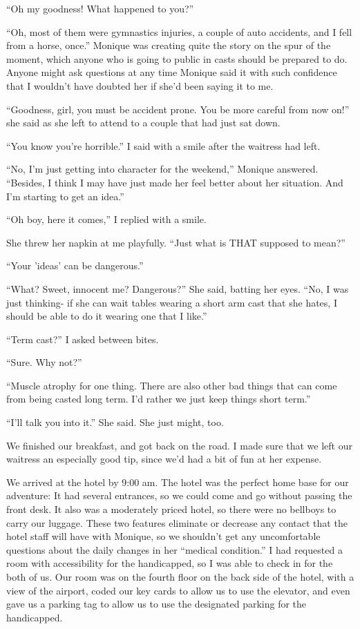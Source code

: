``Oh my goodness! What happened to you?''

``Oh, most of them were gymnastics injuries, a couple of auto accidents, and I fell from a
horse, once.'' Monique was creating quite the story on the spur of the moment, which anyone who
is going to public in casts should be prepared to do. Anyone might ask questions at any time
Monique said it with such confidence that I wouldn't have doubted her if she'd been saying it to
me.

``Goodness, girl, you must be accident prone. You be more careful from now on!'' she said as
she left to attend to a couple that had just sat down.

``You know you're horrible.'' I said with a smile after the waitress had left.

``No, I'm just getting into character for the weekend,'' Monique answered. ``Besides, I think
I may have just made her feel better about her situation. And I'm starting to get an idea.''

``Oh boy, here it comes,'' I replied with a smile.

She threw her napkin at me playfully. ``Just what is THAT supposed to mean?''

``Your 'ideas' can be dangerous.''

``What? Sweet, innocent me? Dangerous?'' She said, batting her eyes. ``No, I was just
thinking- if she can wait tables wearing a short arm cast that she hates, I should be able to do
it wearing one that I like.''

``Term cast?'' I asked between bites.

``Sure. Why not?''

``Muscle atrophy for one thing. There are also other bad things that can come from being
casted long term. I'd rather we just keep things short term.''

``I'll talk you into it.'' She said. She just might, too.

We finished our breakfast, and got back on the road. I made sure that we left our waitress
an especially good tip, since we'd had a bit of fun at her expense.

We arrived at the hotel by 9:00 am. The hotel was the perfect home base for our adventure:
It had several entrances, so we could come and go without passing the front desk. It also was a
moderately priced hotel, so there were no bellboys to carry our luggage. These two features
eliminate or decrease any contact that the hotel staff will have with Monique, so we shouldn't
get any uncomfortable questions about the daily changes in her ``medical condition.'' I had
requested a room with accessibility for the handicapped, so I was able to check in for the both
of us. Our room was on the fourth floor on the back side of the hotel, with a view of the
airport, coded our key cards to allow us to use the elevator, and even gave us a parking tag to
allow us to use the designated parking for the handicapped.

